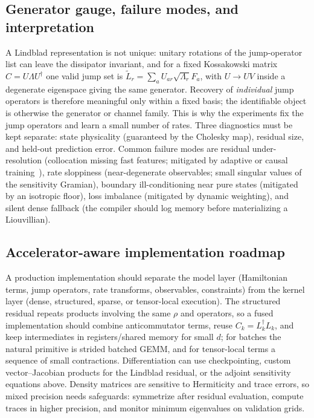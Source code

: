 \documentclass[11pt]{article}
\begin{document}
\subsection{Generator gauge, failure modes, and interpretation}
\label{sec:gauge_failure_modes}
A Lindblad representation is not unique: unitary rotations of the jump-operator list can leave the dissipator invariant, and for a fixed Kossakowski matrix $C=U\Lambda U^\dagger$ one valid jump set is $\widetilde L_r=\sum_a U_{ar}\sqrt{\Lambda_r}F_a$, with $U\to UV$ inside a degenerate eigenspace giving the same generator. Recovery of \emph{individual} jump operators is therefore meaningful only within a fixed basis; the identifiable object is otherwise the generator or channel family. This is why the experiments fix the jump operators and learn a small number of rates. Three diagnostics must be kept separate: state physicality (guaranteed by the Cholesky map), residual size, and held-out prediction error. Common failure modes are residual under-resolution (collocation missing fast features; mitigated by adaptive or causal training~\cite{wang2022respecting}), rate sloppiness (near-degenerate observables; small singular values of the sensitivity Gramian), boundary ill-conditioning near pure states (mitigated by an isotropic floor), loss imbalance (mitigated by dynamic weighting), and silent dense fallback (the compiler should log memory before materializing a Liouvillian).

\subsection{Accelerator-aware implementation roadmap}
\label{sec:accelerator_roadmap}
A production implementation should separate the model layer (Hamiltonian terms, jump operators, rate transforms, observables, constraints) from the kernel layer (dense, structured, sparse, or tensor-local execution). The structured residual repeats products involving the same $\rho$ and operators, so a fused implementation should combine anticommutator terms, reuse $C_k=L_k^\dagger L_k$, and keep intermediates in registers/shared memory for small $d$; for batches the natural primitive is strided batched GEMM, and for tensor-local terms a sequence of small contractions. Differentiation can use checkpointing, custom vector--Jacobian products for the Lindblad residual, or the adjoint sensitivity equations above. Density matrices are sensitive to Hermiticity and trace errors, so mixed precision needs safeguards: symmetrize after residual evaluation, compute traces in higher precision, and monitor minimum eigenvalues on validation grids.
\end{document}
